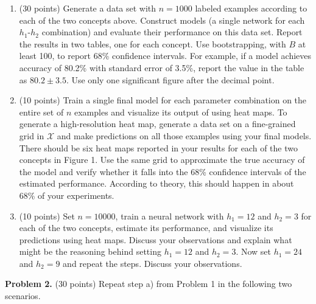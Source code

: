 \documentclass[twoside]{article}
\begin{document}
\begin{enumerate}
\item (30 points) Generate a data set with $n=1000$ labeled examples according to each of the two concepts above. Construct models (a single network for each $h_1$-$h_2$ combination) and evaluate their performance on this data set. Report the results in two tables, one for each concept. Use bootstrapping, with $B$ at least 100, to report 68\% confidence intervals. For example, if a model achieves accuracy of 80.2\% with standard error of 3.5\%, report the value in the table as $80.2\pm 3.5$. Use only one significant figure after the decimal point.
\item (10 points) Train a single final model for each parameter combination on the entire set of $n$ examples and visualize its output of using heat maps. To generate a high-resolution heat map, generate a data set on a fine-grained grid in $\mathcal{X}$ and make predictions on all those examples using your final models. There should be six heat maps reported in your results for each of the two concepts in Figure 1. Use the same grid to approximate the true accuracy of the model and verify whether it falls into the 68\% confidence intervals of the estimated performance. According to theory, this should happen in about 68\% of your experiments.
\item (10 points) Set $n=10000$, train a neural network with $h_1=12$ and $h_2=3$ for each of the two concepts, estimate its performance, and visualize its predictions using heat maps. Discuss your observations and explain what might be the reasoning behind setting $h_1=12$ and $h_2=3$. Now set $h_1=24$ and $h_2=9$ and repeat the steps. Discuss your observations.
\end{enumerate}


\textbf{Problem 2.} (30 points) Repeat step a) from Problem 1 in the following two scenarios.
\end{document}
